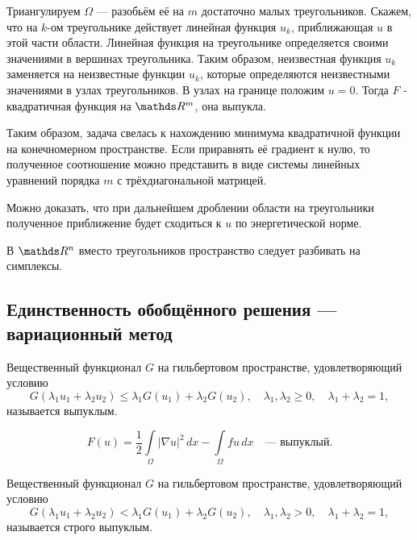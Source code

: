 Триангулируем $\Omega$ --- разобьём её на $m$ достаточно малых треугольников. Скажем, что на $k$-ом треугольнике действует линейная функция $u_k$, приближающая $u$ в этой части области. Линейная функция на треугольнике определяется своими значениями в вершинах треугольника. Таким образом, неизвестная функция $u_k$ заменяется на неизвестные функции $u_k$, которые определяются неизвестными значениями в узлах треугольников. В узлах на границе положим $u = 0$. Тогда $F$ - квадратичная функция на $\real^m$, она выпукла.

Таким образом, задача свелась к нахождению минимума квадратичной функции на конечномерном пространстве. Если приравнять её градиент к нулю, то полученное соотношение можно представить в виде системы линейных уравнений порядка $m$ с трёхдиагональной матрицей.

Можно доказать, что при дальнейшем дроблении области на треугольники полученное приближение будет сходиться к $u$ по энергетической норме.  

В $\real^n$ вместо треугольников пространство следует разбивать на симплексы.

\subsection{Единственность обобщённого решения --- вариационный метод}

\begin{definition} Вещественный функционал $G$ на гильбертовом пространстве, удовлетворяющий условию
$$ G(\lambda_1 u_1 + \lambda_2 u_2) \leq \lambda_1 G(u_1) + \lambda_2 G(u_2), \quad \lambda_1,\lambda_2 \geq 0, \quad \lambda_1 + \lambda_2 = 1,$$
называется выпуклым.
\end{definition}

\begin{exercise}
$$ F(u) = \frac {1} {2} \int \limits_\Omega |\nabla u|^2 \, dx - \int \limits_\Omega fu \, dx \quad \text{--- выпуклый.}$$
\end{exercise}

\begin{definition} Вещественный функционал $G$ на гильбертовом пространстве, удовлетворяющий условию
$$ G(\lambda_1 u_1 + \lambda_2 u_2) < \lambda_1 G(u_1) + \lambda_2 G(u_2), \quad \lambda_1,\lambda_2 > 0, \quad \lambda_1 + \lambda_2 = 1,$$
называется строго выпуклым.
\end{definition}


